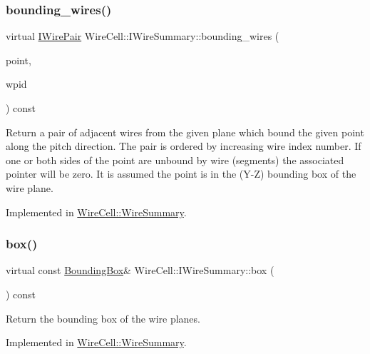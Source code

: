 \subsubsection{\texorpdfstring{bounding\+\_\+wires()}{bounding\_wires()}}
{\footnotesize\ttfamily virtual \hyperlink{namespace_wire_cell_ad5f0e75d8f0e885d9ae4e9154e812d76}{I\+Wire\+Pair} Wire\+Cell\+::\+I\+Wire\+Summary\+::bounding\+\_\+wires (\begin{DoxyParamCaption}\item[{const \hyperlink{namespace_wire_cell_ab2b2565fa6432efbb4513c14c988cda9}{Point} \&}]{point,  }\item[{\hyperlink{class_wire_cell_1_1_wire_plane_id}{Wire\+Plane\+Id}}]{wpid }\end{DoxyParamCaption}) const\hspace{0.3cm}{\ttfamily [pure virtual]}}

Return a pair of adjacent wires from the given plane which bound the given point along the pitch direction. The pair is ordered by increasing wire index number. If one or both sides of the point are unbound by wire (segments) the associated pointer will be zero. It is assumed the point is in the (Y-\/Z) bounding box of the wire plane. 

Implemented in \hyperlink{class_wire_cell_1_1_wire_summary_a0dd41ce408d6cf49e923a1bd0a893038}{Wire\+Cell\+::\+Wire\+Summary}.

\mbox{\label{class_wire_cell_1_1_i_wire_summary_a58909d3b43592b2633c9d4d9109c90fb}} 
\subsubsection{\texorpdfstring{box()}{box()}}
{\footnotesize\ttfamily virtual const \hyperlink{class_wire_cell_1_1_bounding_box}{Bounding\+Box}\& Wire\+Cell\+::\+I\+Wire\+Summary\+::box (\begin{DoxyParamCaption}{ }\end{DoxyParamCaption}) const\hspace{0.3cm}{\ttfamily [pure virtual]}}



Return the bounding box of the wire planes. 



Implemented in \hyperlink{class_wire_cell_1_1_wire_summary_aeb12de01cfc6a14c8745100e5bef3e3d}{Wire\+Cell\+::\+Wire\+Summary}.


